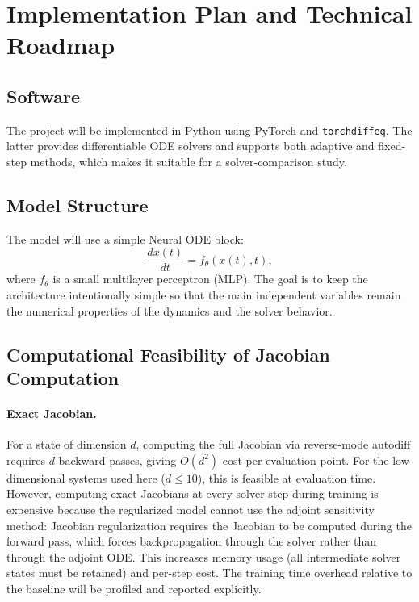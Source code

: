 \documentclass[11pt]{article}
\begin{document}
\section{Implementation Plan and Technical Roadmap}

\subsection{Software}

The project will be implemented in Python using PyTorch and \texttt{torchdiffeq}. The latter provides differentiable ODE solvers and supports both adaptive and fixed-step methods, which makes it suitable for a solver-comparison study.

\subsection{Model Structure}

The model will use a simple Neural ODE block:
\begin{equation}
\frac{d x(t)}{dt} = f_{\theta}(x(t), t),
\end{equation}
where $f_{\theta}$ is a small multilayer perceptron (MLP). The goal is to keep the architecture intentionally simple so that the main independent variables remain the numerical properties of the dynamics and the solver behavior.

\subsection{Computational Feasibility of Jacobian Computation}

\paragraph{Exact Jacobian.}
For a state of dimension $d$, computing the full Jacobian via reverse-mode autodiff requires $d$ backward passes, giving $O(d^2)$ cost per evaluation point. For the low-dimensional systems used here ($d \leq 10$), this is feasible at evaluation time. However, computing exact Jacobians at every solver step during training is expensive because the regularized model cannot use the adjoint sensitivity method: Jacobian regularization requires the Jacobian to be computed during the forward pass, which forces backpropagation through the solver rather than through the adjoint ODE\@. This increases memory usage (all intermediate solver states must be retained) and per-step cost. The training time overhead relative to the baseline will be profiled and reported explicitly.
\end{document}
